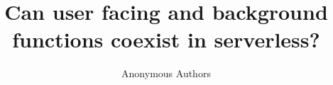 \documentclass[sigconf,anonymous,natbib=false,10pt]{acmart}
\begin{document}

\date{}

\title{Can user facing and background functions coexist in serverless?}


\author{
{\rm Anonymous Authors}\\
} %





\maketitle








%
\printbibliography

\end{document}
